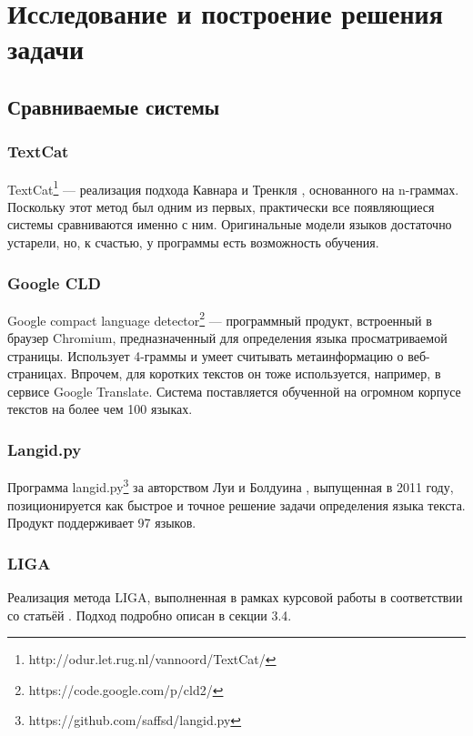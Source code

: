 \documentclass[a4paper, 14pt]{article}
\begin{document}
\pagebreak

\section{Исследование и построение решения задачи}
		\subsection{Сравниваемые системы}
			\subsubsection{TextCat}
			TextCat\footnote{http://odur.let.rug.nl/vannoord/TextCat/} --- реализация подхода Кавнара и Тренкля \cite{canvar}, основанного на n-граммах.
			Поскольку этот метод был одним из первых, практически все появляющиеся системы сравниваются именно
			с ним. 
			Оригинальные модели языков достаточно устарели, но, к счастью, у программы есть возможность обучения.
			\subsubsection{Google CLD}
			Google compact language detector\footnote{https://code.google.com/p/cld2/} --- программный продукт, встроенный в браузер Chromium, 
			предназначенный для определения языка просматриваемой страницы. 
			Использует 4-граммы и умеет считывать метаинформацию
			о веб-страницах. Впрочем, для коротких текстов он тоже используется, например, в сервисе Google Translate. Система поставляется обученной
			на огромном корпусе текстов на более чем 100 языках.
			\subsubsection{Langid.py}
			Программа langid.py\footnote{https://github.com/saffsd/langid.py} за авторством Луи и Болдуина \cite{langid}, выпущенная в 2011 году, позиционируется
			как быстрое и точное решение задачи определения языка текста. Продукт поддерживает 97 языков.
			\subsubsection{LIGA}
			Реализация метода LIGA, выполненная в рамках курсовой работы в соответствии со статьёй \cite{liga}. Подход подробно описан в секции 3.4.
\end{document}
